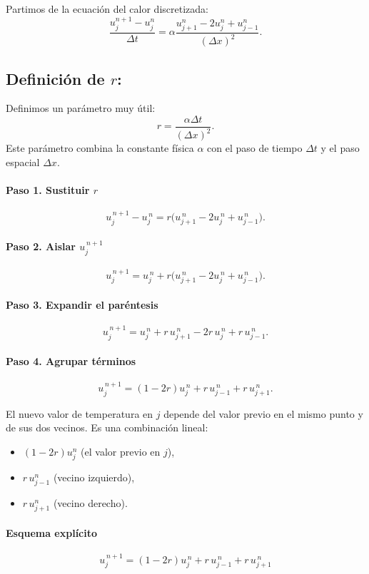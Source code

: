 \documentclass[12pt,a4paper]{article}
\begin{document}
Partimos de la ecuación del calor discretizada:
\[
\frac{u_j^{n+1}-u_j^n}{\Delta t} = \alpha \frac{u_{j+1}^n - 2u_j^n + u_{j-1}^n}{(\Delta x)^2}.
\]

\subsection*{Definición de $r$:}
Definimos un parámetro muy útil:
\[
r = \frac{\alpha \Delta t}{(\Delta x)^2}.
\]
Este parámetro combina la constante física $\alpha$ con el paso de tiempo $\Delta t$ y el paso espacial $\Delta x$.

\paragraph{Paso 1. Sustituir $r$}  
\[
u_j^{\,n+1}-u_j^{\,n} = r\big(u_{j+1}^{\,n}-2u_j^{\,n}+u_{j-1}^{\,n}\big).
\]

\paragraph{Paso 2. Aislar $u_j^{\,n+1}$}  
\[
u_j^{\,n+1} = u_j^{\,n} + r\big(u_{j+1}^{\,n}-2u_j^{\,n}+u_{j-1}^{\,n}\big).
\]

\paragraph{Paso 3. Expandir el paréntesis}  
\[
u_j^{\,n+1} = u_j^{\,n} + r\,u_{j+1}^{\,n} - 2r\,u_j^{\,n} + r\,u_{j-1}^{\,n}.
\]

\paragraph{Paso 4. Agrupar términos}  
\[
u_j^{\,n+1} = (1 - 2r)u_j^{\,n} + r\,u_{j-1}^{\,n} + r\,u_{j+1}^{\,n}.
\]

El nuevo valor de temperatura en $j$ depende del valor previo en el mismo punto y de sus dos vecinos. Es una combinación lineal:
\begin{itemize}
    \item $(1-2r)u_j^n$ (el valor previo en $j$),
    \item $r\,u_{j-1}^n$ (vecino izquierdo),
    \item $r\,u_{j+1}^n$ (vecino derecho).
\end{itemize}

\paragraph{Esquema explícito}  
\[
\boxed{u_j^{\,n+1} = (1 - 2r)u_j^{\,n} + r\,u_{j-1}^{\,n} + r\,u_{j+1}^{\,n}}
\]
\end{document}
